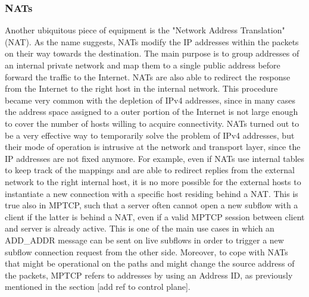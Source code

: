 \subsubsection{NATs}
Another ubiquitous piece of equipment is the "Network Address Translation" (NAT). As the name suggests, NATs modify the IP addresses within the packets on their way towards the destination. The main purpose is to group addresses of an internal private network and map them to a single public address before forward the traffic to the Internet. NATs are also able to redirect the response from the Internet to the right host in the internal network.
This procedure became very common with the depletion of IPv4 addresses, since in many cases the address space assigned to a outer portion of the Internet is not large enough to cover the number of hosts willing to acquire connectivity. 
NATs turned out to be a very effective way to temporarily solve the problem of IPv4 addresses, but their mode of operation is intrusive at the network and transport layer, since the IP addresses are not fixed anymore.
For example, even if NATs use internal tables to keep track of the mappings and are able to redirect replies from the external network to the right internal host, it is no more possible for the external hosts to instantiate a new connection with a specific host residing behind a NAT. This is true also in MPTCP, such that a server often cannot open a new subflow with a client if the latter is behind a NAT, even if a valid MPTCP session between client and server is already active. This is one of the main use cases in which an ADD\_ADDR message can be sent on live subflows in order to trigger a new subflow connection request from the other side.
Moreover, to cope with NATs that might be operational on the paths and might change the source address of the packets, MPTCP refers to addresses by using an Address ID, as previously mentioned in the section [add ref to control plane]. 

